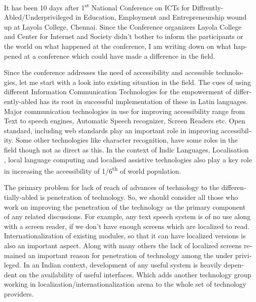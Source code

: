 \newpage
\begin{english}

It has been 10 days after 1\textsuperscript{st} National Conference on ICTs for Diffrently-Abled/Underprivileged in Education, Employment and Entrepreneurship wound up at Layola College, Chennai. Since the Conference organizers Layola College and Center for Internet and Society didn’t bother to inform the participants or the world on what happened at the conference, I am writing down on what happened at a conference which could have made a difference in the field.

Since the conference addresses the need of accessibility and accessible technologies, let me start with a look into existing situation in the field. The cues of using different Information Communication Technologies for the empowerment of differently-abled has its root in successful implementation of these in Latin languages. Major communication technologies in use for improving accessibility range from Text to speech engines, Automatic Speech recognizer, Screen Readers etc. Open standard, including web standards play an important role in improving accessibility. Some other technologies like character recognition, have some roles in the field though not as direct as this. In the context of Indic Languages, Localisation , local language computing and localised assistive technologies also play a key role in increasing the accessibility of 1/6\textsuperscript{th} of world population.

The primary problem for lack of reach of advances of technology to the differentially-abled is penetration of technology. So, we should consider all those who work on improving the penetration of the technology as the primary component of any related discussions. For example, any text speech system is of no use along with a screen reader, if we don’t have enough screens which are localized to read. Internationalization of existing modules, so that it can have localized versions is also an important aspect. Along with many others the lack of localized screens remained an important reason for penetration of technology among the under privileged. In an Indian context, development of any useful system is heavily dependent on the availability of useful interfaces. Which adds another technology group working in localization/internationalization arena to the whole set of technology providers.


\end{english}
